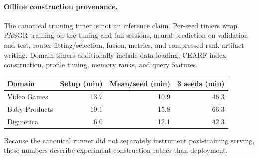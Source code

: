 \documentclass[runningheads]{llncs}
\begin{document}
\paragraph{Offline construction provenance.}
The canonical training timer is not an inference claim. Per-seed timers wrap
PASGR training on the tuning and full sessions, neural prediction on
validation and test, router fitting/selection, fusion, metrics, and compressed
rank-artifact writing. Domain timers additionally include data loading, CEARF
index construction, profile tuning, memory ranks, and query features.
\begin{center}
\small
\begin{tabular}{lrrr}
\toprule
Domain & Setup (min) & Mean/seed (min) & 3 seeds (min)\\
\midrule
Video Games & 13.7 & 10.9 & 46.3\\
Baby Products & 19.1 & 15.8 & 66.3\\
Diginetica & 6.0 & 12.1 & 42.3\\
\bottomrule
\end{tabular}
\end{center}
Because the canonical runner did not separately instrument post-training
serving, these numbers describe experiment construction rather than deployment.
\end{document}
